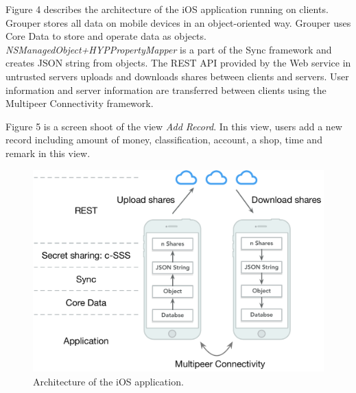 \documentclass[twocolumn,10pt]{article}
\begin{document}
Figure 4 describes the architecture of the iOS application running on clients. Grouper stores all data on mobile devices in an object-oriented way. Grouper uses Core Data to store and operate data as objects. \emph{NSManagedObject+HYPPropertyMapper} is a part of the Sync framework and creates JSON string from objects. The REST API provided by the Web service in untrusted servers uploads and downloads shares between clients and servers. User information and server information are transferred between clients using the Multipeer Connectivity framework.

Figure 5 is a screen shoot of the view \emph{Add Record}. In this view, users add a new record including amount of money, classification, account, a shop, time and remark in this view.

\begin{figure}[t]
	\centering
	\includegraphics[scale=0.35]{architecture}
	\caption{Architecture of the iOS application.}
\end{figure}
\end{document}
